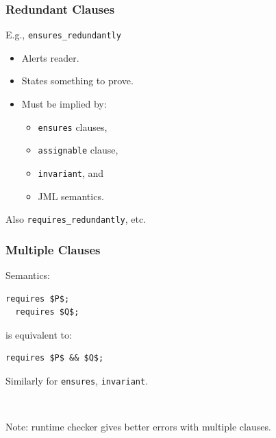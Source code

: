 \begin{frame}[fragile,label=redundantly]
\frametitle{Redundant Clauses}

E.g., \lstinline!ensures_redundantly!
\begin{itemize}
\item
Alerts reader.

\item
States something to prove.

\item
Must be implied by:
\begin{itemize}
\item
\lstinline!ensures! clauses,

\item
\lstinline!assignable! clause,

\item
\lstinline!invariant!, and

\item
JML semantics.
\end{itemize}
\end{itemize}

Also \lstinline!requires_redundantly!, etc.

\end{frame}

\begin{frame}[fragile]
\frametitle{Multiple Clauses}

Semantics:

\begin{lstlisting}[mathescape=true]
  requires $P$;
  requires $Q$;
\end{lstlisting}

is equivalent to:

\begin{lstlisting}[mathescape=true]
  requires $P$ && $Q$;
\end{lstlisting}

Similarly for \lstinline!ensures!, \lstinline!invariant!.

~

Note: runtime checker gives better errors with multiple clauses.

\end{frame}

